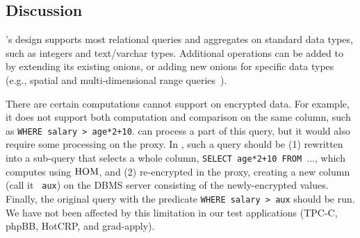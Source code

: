 \subsection{Discussion}

\name{}'s design supports most relational queries and aggregates on
standard data types, such as integers and text/varchar types.
Additional operations can be added to \name{} by extending its
existing onions, or adding new onions for specific data types (e.g.,
spatial and multi-dimensional range
queries~\cite{multidimRangeQueries}).

There are certain computations \name{} cannot support on encrypted
data. For example, it does not support both computation and comparison
on the same column, such as \texttt{WHERE salary > age*2+10}.  \name{}
can process a part of this query, but it would also require some
processing on the proxy.  In \name{}, such a query should be (1)
rewritten into a sub-query that selects a whole column, \texttt{SELECT
  age*2+10 FROM $\ldots$}, which \name{} computes using $\textrm{HOM}$, and
(2) re-encrypted in the proxy, creating a new column (call it {\tt
  aux}) on the DBMS server consisting of the newly-encrypted values.
Finally, the original query with the predicate {\tt WHERE salary >
  aux} should be run.  We have not been affected by this limitation in
our test applications (TPC-C, phpBB, HotCRP, and grad-apply).


% 



